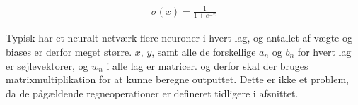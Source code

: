 \documentclass{article}
\begin{document}
\begin{minipage}{0.4\textwidth}
  \begin{align}
    \sigma(x) = \frac{1}{1 + e^{-x}}
  \end{align}
\end{minipage}
\begin{minipage}{0.6\textwidth}
  \begin{center}
    \label{fig:sigmoid}
  \end{center}
\end{minipage}
Typisk har et neuralt netværk flere neuroner i hvert lag, og antallet af vægte og biases er derfor meget større. $x$, $y$, samt alle de forskellige $a_n$ og $b_n$ for hvert lag er søjlevektorer, og $w_n$ i alle lag er matricer. og derfor skal der bruges matrixmultiplikation for at kunne beregne outputtet. Dette er ikke et problem, da de pågældende regneoperationer er defineret tidligere i afsnittet.  
\end{document}
